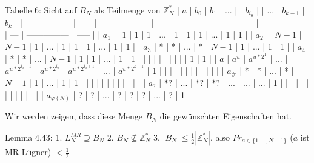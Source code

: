 \documentclass[a4paper]{article}
\begin{document}
\begin{multicols}{3}
        Tabelle 6: Sicht auf $B_N$ als Teilmenge von $\mathbb{Z}^*_N$
        | $a$              | $b_0$ | $b_1$       | ...  |                   | $b_{i_0}$       |                   | ... | $b_{k-1}$       | $b_k$ |
        | ---------------- | ----- | ----------- | ---- | ----------------- | --------------- | ----------------- | --- | --------------- | ----- |
        | $a_1=1$          | 1     | 1           | ...  | 1                 | 1               | 1                 | ... | 1               | 1     |
        | $a_2=N-1$        | $N-1$ | 1           | ...  | 1                 | 1               | 1                 | ... | 1               | 1     |
        | $a_3$            | *     | *           | ...  | *                 | $N-1$           | 1                 | ... | 1               | 1     |
        | $a_4$            | *     | *           | ...  | $N-1$             | 1               | 1                 | ... | 1               | 1     |
        |                  |       |             |      |                   |                 |                   |     | 1               | 1     |
        | $a$              | $a^u$ | $a^{u*2^1}$ | ...  | $a^{u*2^{i_0-1}}$ | $a^{u*2^{i_0}}$ | $a^{u*2^{i_0+1}}$ | ... | $a^{u*2^{k-1}}$ | 1     |
        |                  |       |             |      |                   |                 |                   |     |                 |       |
        | $a_{\#}$            | *     | *           | ...  | *                 | $N-1$           | 1                 | ... | 1               | 1     |
        |                  |       |             |      |                   |                 |                   |     |                 |       |
        | $a_?$            | $*?$  | ...         | $*?$ | $*?$              | ...             | ...               | ... | 1               |       |
        |                  |       |             |      |                   |                 |                   |     |                 |       |
        | $a_{\varphi(N)}$ | ?     | ?           | ...  | ?                 | ?               | ?                 | ... | ?               | 1     |


        Wir werden zeigen, dass diese Menge $B_N$ die gewünschten Eigenschaften hat.

        Lemma 4.43:
        1. $L^{MR}_N \supseteq B_N$
        2. $B_N \not\subseteq \mathbb{Z}^*_N$
        3. $|B_N|\leq \frac{1}{2} | \mathbb{Z}^*_N|$, also $Pr_{a\in\{1,...,N-1\}}$ ($a$ ist MR-Lügner) $<\frac{1}{2}$


\end{multicols}
\end{document}
